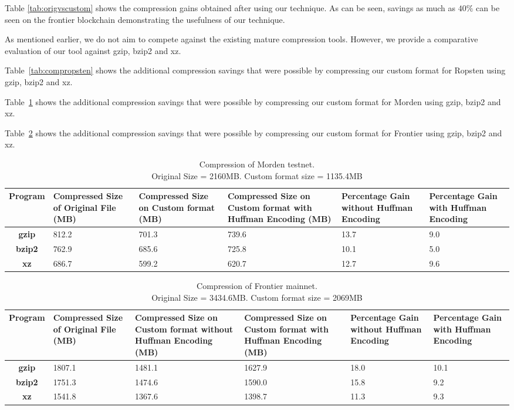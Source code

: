 \FloatBarrier
Table \ref{tab:origvscustom} shows the compression gains obtained after using our technique.
As can be seen, savings as much as $40\%$ can be seen on the frontier
blockchain demonstrating the usefulness of our technique.

As mentioned earlier, we do not aim to compete against the existing mature compression tools.
However, we provide a comparative evaluation of our tool against gzip, bzip2 and xz. 

Table~\ref{tab:compropsten} 
shows the additional compression savings that were possible by compressing 
our custom format for Ropsten using gzip, bzip2 and xz.

Table~\ref{tab:compmorden} 
shows the additional compression savings that were possible by compressing 
our custom format for Morden using gzip, bzip2 and xz.

Table~\ref{tab:compfrontier} 
shows the additional compression savings that were possible by compressing 
our custom format for Frontier  using gzip, bzip2 and xz.




\begin{table}[!t]
\centering
\captionsetup{justification=centering}
\begin{tabular}{ >{\bfseries}c| p{2cm} | p{2cm} | p{2cm} | p{1.5cm} | p{1.5cm} }
	Program & {Compressed Size of Original File (MB)} & {Compressed Size on Custom format (MB)} & {Compressed Size on Custom format with Huffman Encoding (MB)} & Percentage Gain without Huffman Encoding & Percentage Gain with Huffman Encoding \\
  \hline
  gzip  & 812.2 & 701.3 & 739.6 & 13.7 & 9.0 \\
  bzip2 & 762.9 & 685.6 & 725.8 & 10.1 & 5.0 \\
  xz   & 686.7 & 599.2 &  620.7 & 12.7 & 9.6 \\
\end{tabular}
\caption{Compression of Morden testnet. \\Original Size = 2160MB. Custom format size = 1135.4MB}
\label{tab:compmorden}
\end{table}

\begin{table}[!b]
	\centering
\captionsetup{justification=centering}
\begin{tabular}{ >{\bfseries}c| p{2cm} | p{2cm} | p{2cm} | p{1.5cm} | p{1.5cm} }
	Program & {Compressed Size of Original File (MB)} & {Compressed Size on Custom format without Huffman Encoding (MB)} & {Compressed Size on Custom format with Huffman Encoding (MB)} &Percentage Gain without Huffman Encoding & Percentage Gain with Huffman Encoding\\
  \hline
  gzip  & 1807.1 & 1481.1 & 1627.9 & 18.0 & 10.1 \\
  bzip2 & 1751.3 & 1474.6 & 1590.0 & 15.8 & 9.2 \\
  xz   & 1541.8 & 1367.6 & 1398.7 & 11.3  & 9.3 \\
\end{tabular}
\caption{Compression of Frontier mainnet. \\ Original Size = 3434.6MB. Custom format size = 2069MB}
\label{tab:compfrontier}
\end{table}

